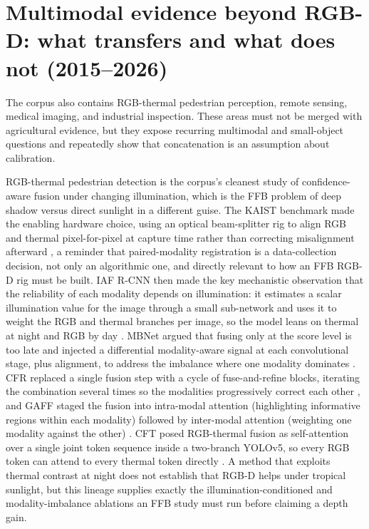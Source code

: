 \section{Multimodal evidence beyond RGB-D: what transfers and what does not (2015--2026)}

The corpus also contains RGB-thermal pedestrian perception, remote sensing, medical imaging, and industrial inspection. These areas must not be merged with agricultural evidence, but they expose recurring multimodal and small-object questions and repeatedly show that concatenation is an assumption about calibration.

RGB-thermal pedestrian detection is the corpus's cleanest study of confidence-aware fusion under changing illumination, which is the FFB problem of deep shadow versus direct sunlight in a different guise. The KAIST benchmark made the enabling hardware choice, using an optical beam-splitter rig to align RGB and thermal pixel-for-pixel at capture time rather than correcting misalignment afterward \cite{hwang2015kaist}, a reminder that paired-modality registration is a data-collection decision, not only an algorithmic one, and directly relevant to how an FFB RGB-D rig must be built. IAF R-CNN then made the key mechanistic observation that the reliability of each modality depends on illumination: it estimates a scalar illumination value for the image through a small sub-network and uses it to weight the RGB and thermal branches per image, so the model leans on thermal at night and RGB by day \cite{li2019illumination}. MBNet argued that fusing only at the score level is too late and injected a differential modality-aware signal at each convolutional stage, plus alignment, to address the imbalance where one modality dominates \cite{zhou2020mbnet}. CFR replaced a single fusion step with a cycle of fuse-and-refine blocks, iterating the combination several times so the modalities progressively correct each other \cite{zhang2020cfr}, and GAFF staged the fusion into intra-modal attention (highlighting informative regions within each modality) followed by inter-modal attention (weighting one modality against the other) \cite{zhang2021gaff}. CFT posed RGB-thermal fusion as self-attention over a single joint token sequence inside a two-branch YOLOv5, so every RGB token can attend to every thermal token directly \cite{fang2022cft}. A method that exploits thermal contrast at night does not establish that RGB-D helps under tropical sunlight, but this lineage supplies exactly the illumination-conditioned and modality-imbalance ablations an FFB study must run before claiming a depth gain.

